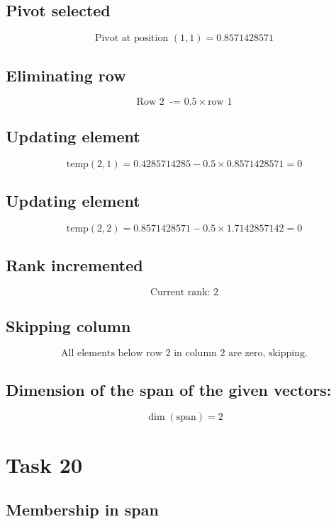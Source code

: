 \documentclass{article}
\begin{document}
\subsection*{ \vspace{1em} Pivot selected}
\[
\text{Pivot at position } ( 1,1 ) = 0.8571428571
\]
\subsection*{ \vspace{1em} Eliminating row}
\[
\text{Row } 2\ \text{ -= } 0.5 \times \text{row } 1
\]
\subsection*{ \vspace{1em} Updating element}
\[
\text{temp}( 2,1 ) = 0.4285714285 - 0.5 \times 0.8571428571 = 0
\]
\subsection*{ \vspace{1em} Updating element}
\[
\text{temp}( 2,2 ) = 0.8571428571 - 0.5 \times 1.7142857142 = 0
\]
\subsection*{ \vspace{1em} Rank incremented}
\[
\text{Current rank: } 2
\]
\subsection*{ \vspace{1em} Skipping column}
\[
\text{All elements below row } 2 \text{ in column } 2 \text{ are zero, skipping.}
\]
\medskip

\subsection*{ \vspace{1em} Dimension of the span of the given vectors:}
\[
\dim(\text{span}) = 2
\]
\bigskip

\hrulefill
\bigskip

\section*{Task 20}

\subsection*{Membership in span}
\end{document}
